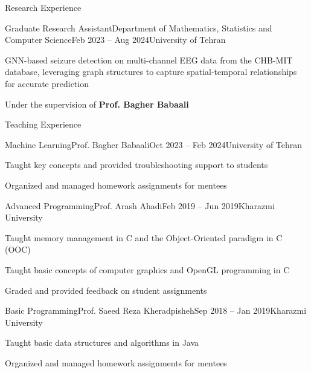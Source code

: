 \documentclass[]{main}
\begin{document}

\begin{section}{Research Experience}
 \begin{subsection}{Graduate Research Assistant}{Department of Mathematics, Statistics and Computer Science}{Feb 2023 -- Aug 2024}{University of Tehran}
     \item GNN-based seizure detection on multi-channel EEG data from the CHB-MIT database, leveraging graph structures to capture spatial-temporal relationships for accurate prediction
     \item Under the supervision of \textbf{Prof. Bagher Babaali}
 \end{subsection}
\end{section}

\begin{section}{Teaching Experience}
 \begin{subsection}{Machine Learning}{Prof. Bagher Babaali}{Oct 2023 -- Feb 2024}{University of Tehran}
     \item Taught key concepts and provided troubleshooting support to students
     \item Organized and managed homework assignments for mentees
 \end{subsection}
 \begin{subsection}{Advanced Programming}{Prof. Arash Ahadi}{Feb 2019 -- Jun 2019}{Kharazmi University}
     \item Taught memory management in C and the Object-Oriented paradigm in C (OOC) \;\href{https://github.com/ckoliber/ooc_lecture}{\faExternalLink*}
     \item Taught basic concepts of computer graphics and OpenGL programming in C \;\href{https://github.com/ckoliber/opengl}{\faExternalLink*}
     \item Graded and provided feedback on student assignments
 \end{subsection}
 \begin{subsection}{Basic Programming}{Prof. Saeed Reza Kheradpisheh}{Sep 2018 -- Jan 2019}{Kharazmi University}
     \item Taught basic data structures and algorithms in Java
     \item Organized and managed homework assignments for mentees \;\href{https://github.com/ckoliber/Phy97Sources}{\faExternalLink*}
 \end{subsection}
\end{section}
\end{document}
